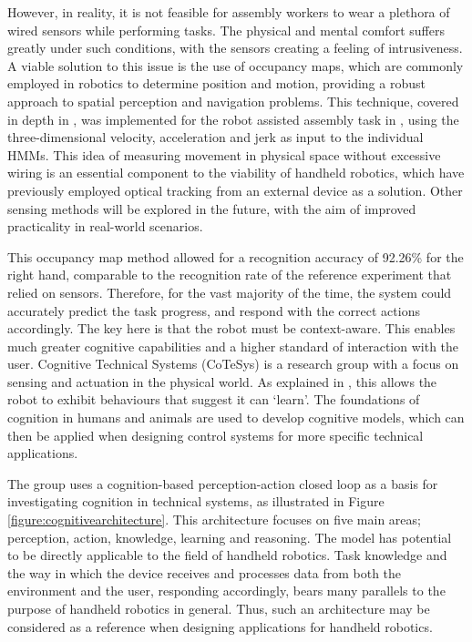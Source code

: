\documentclass[11pt]{article}
\begin{document}
However, in reality, it is not feasible for assembly workers to wear a plethora of wired sensors while performing tasks. The physical and mental comfort suffers greatly under such conditions, with the sensors creating a feeling of intrusiveness. A viable solution to this issue is the use of occupancy maps, which are commonly employed in robotics to determine position and motion, providing a robust approach to spatial perception and navigation problems. This technique, covered in depth in \cite{elfes1989}, was implemented for the robot assisted assembly task in \cite{lenz2011}, using the three-dimensional velocity, acceleration and jerk as input to the individual HMMs. This idea of measuring movement in physical space without excessive wiring is an essential component to the viability of handheld robotics, which have previously employed optical tracking from an external device as a solution. Other sensing methods will be explored in the future, with the aim of improved practicality in real-world scenarios.

This occupancy map method allowed for a recognition accuracy of 92.26\% for the right hand, comparable to the recognition rate of the reference experiment that relied on sensors. Therefore, for the vast majority of the time, the system could accurately predict the task progress, and respond with the correct actions accordingly. The key here is that the robot must be context-aware. This enables much greater cognitive capabilities and a higher standard of interaction with the user. Cognitive Technical Systems (CoTeSys) is a research group with a focus on sensing and actuation in the physical world. As explained in \cite{buss2010}, this allows the robot to exhibit behaviours that suggest it can `learn'. The foundations of cognition in humans and animals are used to develop cognitive models, which can then be applied when designing control systems for more specific technical applications. 

The group uses a cognition-based perception-action closed loop as a basis for investigating cognition in technical systems, as illustrated in Figure \ref{figure:cognitivearchitecture}. This architecture focuses on five main areas; perception, action, knowledge, learning and reasoning. The model has potential to be directly applicable to the field of handheld robotics. Task knowledge and the way in which the device receives and processes data from both the environment and the user, responding accordingly, bears many parallels to the purpose of handheld robotics in general. Thus, such an architecture may be considered as a reference when designing applications for handheld robotics. 
\end{document}
